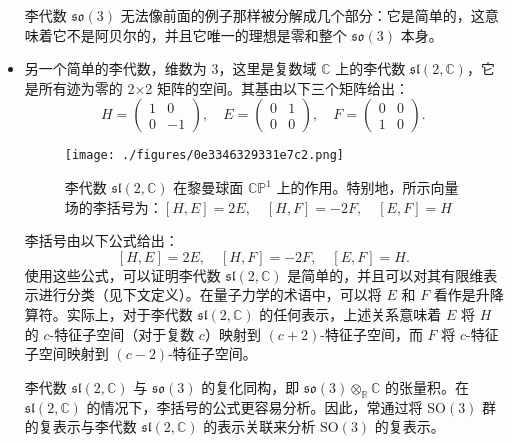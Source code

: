 \begin{itemize}
李代数 \( \mathfrak{so}(3) \) 无法像前面的例子那样被分解成几个部分：它是简单的，这意味着它不是阿贝尔的，并且它唯一的理想是零和整个 \( \mathfrak{so}(3) \) 本身。
\item 另一个简单的李代数，维数为 3，这里是复数域 \( \mathbb{C} \) 上的李代数 \( \mathfrak{sl}(2, \mathbb{C}) \)，它是所有迹为零的 2×2 矩阵的空间。其基由以下三个矩阵给出：
\[
H = \left( \begin{array}{cc} 1 & 0 \\ 0 & -1 \end{array} \right), \quad E = \left( \begin{array}{cc} 0 & 1 \\ 0 & 0 \end{array} \right), \quad F = \left( \begin{array}{cc} 0 & 0 \\ 1 & 0 \end{array} \right).~
\]
\begin{figure}[ht]
\centering
\texttt{[image: ./figures/0e3346329331e7c2.png]}
\caption{李代数 \( \mathfrak{sl}(2, \mathbb{C}) \) 在黎曼球面 \( \mathbb{CP}^1 \) 上的作用。特别地，所示向量场的李括号为：\([H, E] = 2E, \quad [H, F] = -2F, \quad [E, F] = H\)} \label{fig_LieDS_1}
\end{figure}
李括号由以下公式给出：
\[
[H, E] = 2E, \quad [H, F] = -2F, \quad [E, F] = H.~
\]
使用这些公式，可以证明李代数 \( \mathfrak{sl}(2, \mathbb{C}) \) 是简单的，并且可以对其有限维表示进行分类（见下文定义）。在量子力学的术语中，可以将 \( E \) 和 \( F \) 看作是升降算符。实际上，对于李代数 \( \mathfrak{sl}(2, \mathbb{C}) \) 的任何表示，上述关系意味着 \( E \) 将 \( H \) 的 \( c \)-特征子空间（对于复数 \( c \)）映射到 \( (c+2) \)-特征子空间，而 \( F \) 将 \( c \)-特征子空间映射到 \( (c-2) \)-特征子空间。

李代数 \( \mathfrak{sl}(2, \mathbb{C}) \) 与 \( \mathfrak{so}(3) \) 的复化同构，即 \( \mathfrak{so}(3) \otimes_{\mathbb{R}} \mathbb{C} \) 的张量积。在 \( \mathfrak{sl}(2, \mathbb{C}) \) 的情况下，李括号的公式更容易分析。因此，常通过将 \( \mathrm{SO}(3) \) 群的复表示与李代数 \( \mathfrak{sl}(2, \mathbb{C}) \) 的表示关联来分析 \( \mathrm{SO}(3) \) 的复表示。
\end{itemize}